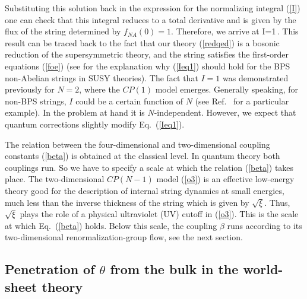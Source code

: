 Substituting this solution back in  the expression for the
normalizing integral  (\ref{I}) one can check that
this integral   reduces to a total derivative and is given
by the flux of the string  determined by $f_{NA}(0)=1$.
Therefore, we arrive at
\beq
I=1\,.
\label{Ieq1}
\eeq
This result can be traced back to the fact that our theory (\ref{redqed}) 
is a bosonic reduction of the
\ntwo supersymmetric theory, and the string satisfies the first-order equations
(\ref{foe}) (see \cite{ShifmanYung} for the explanation why 
(\ref{Ieq1}) should hold   for the BPS non-Abelian strings in SUSY theories).
The fact that $I=1$ was demonstrated previously for $N=2$, where  the $CP(1)$ 
model emerges.
Generally speaking, for non-BPS strings, $I$
could  be a certain  function of $N$ (see Ref.~\cite{Markov} for a 
particular example). In the problem at hand it is $N$-independent. However, 
we expect that quantum corrections
slightly  modify Eq.~(\ref{Ieq1}).

The relation between the four-dimensional and two-dimensional coupling
constants (\ref{beta}) is obtained  at the classical level. In quantum theory
both couplings run. So we have to specify a scale at which the relation
(\ref{beta}) takes place. The two-dimensional $CP(N-1)$ model 
(\ref{o3}) is
an effective low-energy theory good for the description of
internal string dynamics   at small energies,  much less than the 
inverse thickness of the string which is given by $\sqrt{\xi}$. Thus, 
$\sqrt{\xi}$ plays the role of a physical ultraviolet (UV) cutoff in (\ref{o3}). 
This is the scale at which Eq.~(\ref{beta}) holds. Below this scale, the
coupling $\beta$ runs according to its two-dimensional renormalization-group flow, 
see the next section.

\subsection{Penetration of $\theta$ from the bulk  in the world-sheet
theory}
\label{penethe}

